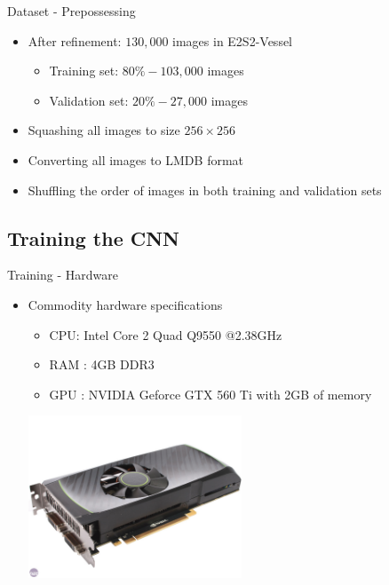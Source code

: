 \documentclass[slidestop,compress,mathserif,notes]{beamer}
\begin{document}
\begin{frame}{Dataset - Prepossessing}
\begin{itemize}
    \item After refinement: $130,000$ images in E2S2-Vessel
    \begin{itemize}
        \item Training set: $80\% - 103,000$ images
        \item Validation set: $20\% - 27,000$ images
    \end{itemize}
    \item Squashing all images to size $256\times256$
    \item Converting all images to LMDB format
    \item Shuffling the order of images in both training and validation sets
\end{itemize}
\end{frame}

\subsection{Training the CNN}
\begin{frame}{Training - Hardware}
    \begin{itemize}
        \item Commodity hardware specifications
        \begin{itemize}
            \item CPU: Intel Core 2 Quad Q9550 @2.38GHz
            \item RAM : 4GB DDR3
            \item GPU : NVIDIA Geforce GTX 560 Ti with 2GB of memory
        \end{itemize}
        \centering
        \includegraphics[width=0.5\textwidth]{pic/gtx560.jpg}
    \end{itemize}
\end{frame}
\end{document}
